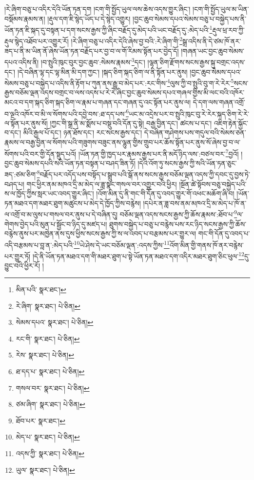 །རེ་ཞིག་བཅུ་པ་འདིར་དེའི་ཡོན་ཏན་དག །ངག་གི་སྤྱོད་ཡུལ་ལས་ཆེས་འདས་གྱུར་ཞིང་། །ངག་གི་སྤྱོད་ཡུལ་མ་ཡིན་བསྡོམས་རྣམས་ན། །རྡུལ་དག་ཇི་སྙེད་ཡོད་པ་དེ་སྙེད་འགྱུར། །བྱང་ཆུབ་སེམས་དཔའ་སེམས་བཅུ་པ་བསྐྱེད་པས་ནི་ཡོན་ཏན་ཇི་སྐད་དུ་བསྟན་པ་དག་སངས་རྒྱས་ཀྱི་ཞིང་བརྗོད་དུ་མེད་པའི་ཡང་བརྗོད་དུ་:མེད་པའི་\footnote{མིན་པའི་  སྣར་ཐང་། }རྡུལ་ཕྲ་རབ་ཀྱི་རྡུལ་སྙེད་འཐོབ་པར་འགྱུར་རོ། །རེ་ཞིག་བཅུ་པ་འདིར་དེའི་ཞེས་བྱ་བའི་:རེ་ཞིག་གི་\footnote{རེ་ཞིག་  སྣར་ཐང་།  པེ་ཅིན། }སྒྲ་འདིས་ནི་དེ་ཙམ་ཁོ་ནར་ཟད་པ་ནི་མ་ཡིན་ནོ་ཞེས་ཡོན་ཏན་བརྗོད་པར་བྱ་བ་ལ་གོ་རིམས་སྟོན་པར་བྱེད་དོ། །གཞན་ཡང་བྱང་ཆུབ་སེམས་དཔའ་འདིས་ནི། །བ་སྤུའི་ཁུང་བུར་བྱང་ཆུབ་:སེམས་རྣམས་\footnote{སེམས་དཔའ་  སྣར་ཐང་།  པེ་ཅིན། }དང་། །ལྷན་ཅིག་རྫོགས་སངས་རྒྱས་སྐུ་བགྲང་འདས་དང་། །དེ་བཞིན་ལྷ་དང་ལྷ་མིན་མི་དག་ཀྱང་། །སྐད་ཅིག་སྐད་ཅིག་ལ་ནི་སྟོན་པར་ནུས། །བྱང་ཆུབ་སེམས་དཔའ་སེམས་བཅུ་པ་བསྐྱེད་པ་འདིས་ནི་རྟོག་པ་ཀུན་ནས་རྒྱུ་བ་མེད་པར་:རང་གིས་\footnote{རང་གི་  སྣར་ཐང་།  པེ་ཅིན། }ལུས་ཀྱི་བ་སྤུའི་བུ་ག་རེ་རེར་\footnote{རེས་  སྣར་ཐང་།  པེ་ཅིན། }སངས་རྒྱས་བཅོམ་ལྡན་འདས་བགྲང་བ་ལས་འདས་པ་རེ་རེ་ཞིང་བྱང་ཆུབ་སེམས་དཔའ་གཞལ་གྱིས་མི་ལང་བའི་འཁོར་མངའ་བ་དག་སྐད་ཅིག་སྐད་ཅིག་ལ་རྣམ་པ་གཞན་དང་གཞན་དུ་འང་སྟོན་པར་ནུས་ལ། དེ་དག་ལས་གཞན་འགྲོ་བ་ལྔའི་འཁོར་བ་མི་ལ་སོགས་པའི་དབྱེ་བས་:ཐ་དད་པས་\footnote{ཐ་དད་པ་  སྣར་ཐང་།  པེ་ཅིན། }ཡང་མ་འདྲེས་པར་བ་སྤུའི་ཁུང་བུ་རེ་རེར་སྐད་ཅིག་རེ་རེ་ལ་སྟོན་པར་ནུས་སོ། །ཀྱང་གི་སྒྲ་ནི་མ་སྨོས་པ་བསྡུ་བའི་དོན་དུ་སྟེ། བརྒྱ་བྱིན་དང་། ཚངས་པ་དང་། འཇིག་རྟེན་སྐྱོང་བ་དང་། མིའི་རྒྱལ་པོ་དང་། ཉན་ཐོས་དང་། རང་སངས་རྒྱས་དང་། དེ་བཞིན་གཤེགས་པས་གདུལ་བའི་སེམས་ཅན་རྣམས་ལ་བརྒྱ་བྱིན་ལ་སོགས་པའི་གཟུགས་བཟུང་ནས་ལྷུན་གྱིས་གྲུབ་པར་ཆོས་སྟོན་པར་ནུས་སོ་ཞེས་བྱ་བ་ལ་སོགས་པའི་བར་གྱི་དོན་སྡུད་པའོ། །ཡོན་ཏན་གྱི་ཁྱད་པར་རྣམས་རྒྱས་པར་ནི་མདོ་ཉིད་ལས་:བཙལ་བར་\footnote{གསལ་བར་  སྣར་ཐང་།  པེ་ཅིན། }བྱའོ། །བྱང་ཆུབ་སེམས་དཔའི་སའི་ཡོན་ཏན་བསྟན་པ་བཤད་ཟིན་ཏོ། །དེའི་འོག་ཏུ་སངས་རྒྱས་ཀྱི་སའི་ཡོན་ཏན་ཅུང་ཟད་:ཙམ་ཅིག་\footnote{ཙམ་ཞིག་  སྣར་ཐང་།  པེ་ཅིན། }བརྗོད་པར་འདོད་པས་བསྟོད་པ་སྒྲུབ་པའི་སྒོ་ནས་སངས་རྒྱས་བཅོམ་ལྡན་འདས་ཀྱི་དབང་དུ་བྱས་ཏེ་བཤད་པ། གང་ཕྱིར་ནམ་མཁའ་དྲི་མ་མེད་ལ་ཟླ་སྣང་གསལ་བར་འགྱུར་བའི་ཕྱིར། །སྔོན་ཚེ་སྟོབས་བཅུ་བསྐྱེད་པའི་ས་ལ་ཁྱོད་ཀྱིས་སླར་ཡང་འབད་གྱུར་ཞིང་། །འོག་མིན་དུ་ནི་གང་གི་དོན་དུ་འབད་གྱུར་གོ་འཕང་མཆོག་ཞི་བ། །ཡོན་ཏན་མཐའ་དག་མཐར་ཐུག་མཚུངས་པ་མེད་དེ་ཁྱོད་ཀྱིས་བརྙེས། །དཔེར་ན་ཟླ་བས་ནམ་མཁའ་དྲི་མ་མེད་པ་ཁོ་ན་ལ་འགྲོ་བ་མ་ལུས་པ་གསལ་བར་ནུས་པ་དེ་བཞིན་དུ། བཅོམ་ལྡན་འདས་སངས་རྒྱས་ཀྱི་ཆོས་རྣམས་:ཐོབ་པ་\footnote{ཐོབ་པར་  སྣར་ཐང་། }ལ་གེགས་བྱེད་པའི་མུན་པ་སྦྱོང་བ་ཉིད་དུ་མཛད་པ། ཐུགས་བསྐྱེད་པ་བཅུ་པ་བརྙེས་པས་རང་ཉིད་སངས་རྒྱས་ཀྱི་ཆོས་བརྙེས་ནུས་པར་མཁྱེན་ནས་དུས་ཕྱིས་སངས་རྒྱས་ཀྱི་ས་ལ་འབད་པ་བརྩམས་པར་གྱུར་ལ། གང་གི་དོན་དུ་འབད་པ་འདི་བརྩམས་པ་བླ་ན་:མེད་པའི་\footnote{མེད་པ་  སྣར་ཐང་།  པེ་ཅིན། }ཡེ་ཤེས་དེ་ཡང་བཅོམ་ལྡན་:འདས་ཀྱིས་\footnote{འདས་ཀྱི་  སྣར་ཐང་།  པེ་ཅིན། }འོག་མིན་གྱི་གནས་ཁོ་ནར་བརྙེས་པར་གྱུར་ཏོ། །དེ་ནི་ཡོན་ཏན་མཐའ་དག་གི་མཐར་ཐུག་པ་སྟེ་ཡོན་ཏན་མཐའ་དག་འདིར་མཐར་ཐུག་ཅིང་ཕུལ་\footnote{ཡུལ་  སྣར་ཐང་།  པེ་ཅིན། }དུ་བྱུང་བའི་ཕྱིར་རོ། །
